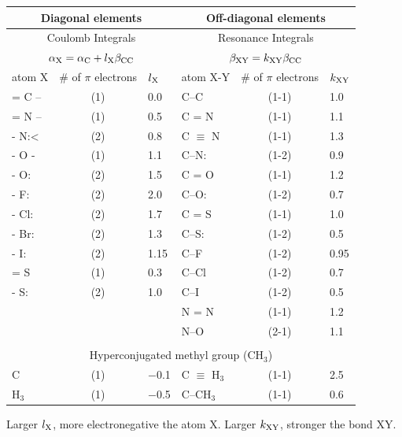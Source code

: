 \documentclass[../Main/chem532-notes.tex]{subfiles}
\begin{document}
\begin{table}[h!]
   \centering
   \begin{tabular}{@{} lcllcl @{}} %
      \toprule
	\multicolumn{3}{c}{Diagonal elements} & \multicolumn{3}{c}{Off-diagonal elements} \\
	\midrule
	\multicolumn{3}{c}{Coulomb Integrals} & \multicolumn{3}{c}{Resonance Integrals}\\
	\multicolumn{3}{c}{$\alpha_{\rm X} = \alpha_{\rm C} + l_{\rm X} \beta_{\rm CC}$}
	& \multicolumn{3}{c}{$\beta_{\rm XY} = k_{\rm XY} \beta_{\rm CC}$}\\
	\midrule
	atom X & \# of $\pi$ electrons & $l_{\rm X}$ & atom X-Y & \# of $\pi$ electrons & $k_{\rm XY}$ \\
	\midrule
	= C -- & (1) & 0.0 & C--C & (1-1) & 1.0 \\
	= N -- & (1) & 0.5 & C = N & (1-1) & 1.1 \\
	- N:< & (2) & 0.8 & C $\equiv$ N & (1-1) & 1.3 \\
	- O - & (1) & 1.1 & C--N: & (1-2) & 0.9 \\
	- O: & (2) & 1.5 & C = O & (1-1) & 1.2 \\
	- F: & (2) & 2.0 & C--O: & (1-2) & 0.7 \\
	- Cl: & (2) & 1.7 & C = S & (1-1) & 1.0 \\
	- Br: & (2) & 1.3 & C--S: & (1-2) & 0.5 \\
	- I: & (2) & 1.15 & C--F & (1-2) & 0.95 \\
	= S & (1) & 0.3 & C--Cl & (1-2) & 0.7 \\
	- S: & (2) & 1.0 & C--I & (1-2) & 0.5 \\
	& & & N = N & (1-1) & 1.2\\
	& & & N--O & (2-1) & 1.1 \\
	\\
	\multicolumn{6}{c}{Hyperconjugated methyl group (CH$_3$)}  \\
	C & (1) & $-$0.1 &  C $\equiv$ H$_3$ & (1-1) & 2.5   \\
	H$_3$ & (1) & $-$0.5 & C--CH$_3$ & (1-1) & 0.6\\
	\bottomrule
   \end{tabular}
   
   Larger $l_{\rm X}$, more electronegative the atom X. Larger $k_{\rm XY}$, stronger the bond XY.
   \label{tab:booktabs}
\end{table}
\end{document}
